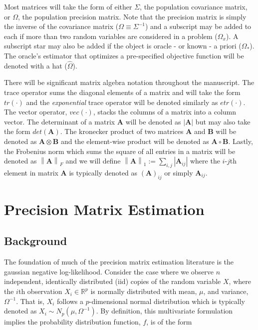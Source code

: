 \documentclass[11pt,]{report}
\theoremstyle{definition}
\theoremstyle{definition}
\theoremstyle{definition}
\theoremstyle{remark}
\begin{document}
Most matrices will take the form of either \(\Sigma\), the population covariance matrix, or \(\Omega\), the population precision matrix. Note that the precision matrix is simply the inverse of the covariance matrix (\(\Omega \equiv \Sigma^{-1}\)) and a subscript may be added to each if more than two random variables are considered in a problem (\(\Omega_{x}\)). A subscript star may also be added if the object is oracle - or known - a priori (\(\Omega_{*}\)). The oracle's estimator that optimizes a pre-specified objective function will be denoted with a hat (\(\hat{\Omega}\)).

There will be significant matrix algebra notation throughout the manuscript. The trace operator sums the diagonal elements of a matrix and will take the form \(tr\left(\cdot\right)\) and the \emph{exponential} trace operator will be denoted similarly as \(etr\left(\cdot\right)\). The vector operator, \(vec\left(\cdot\right)\), stacks the columns of a matrix into a column vector. The determinant of a matrix \(\mathbf{A}\) will be denoted as \(\left|\mathbf{A}\right|\) but may also take the form \(det\left(\mathbf{A}\right)\). The kronecker product of two matrices \(\mathbf{A}\) and \(\mathbf{B}\) will be denoted as \(\mathbf{A} \otimes \mathbf{B}\) and the element-wise product will be denoted as \(\mathbf{A} \circ \mathbf{B}\). Lastly, the Frobenius norm which sums the square of all entries in a matrix will be denoted as \(\left\|\mathbf{A}\right\|_{F}\) and we will define \(\left\|\mathbf{A}\right\|_{1} := \sum_{i, j}\left|\mathbf{A}_{ij}\right|\) where the \(i\)-\(j\)th element in matrix \(\mathbf{A}\) is typically denoted as \(\left(\mathbf{A}\right)_{ij}\) or simply \(\mathbf{A}_{ij}\).

\hypertarget{precision-matrix-estimation}{%
\chapter{Precision Matrix Estimation}\label{precision-matrix-estimation}}

\hypertarget{background}{%
\section{Background}\label{background}}

The foundation of much of the precision matrix estimation literature is the gaussian negative log-likelihood. Consider the case where we observe \(n\) independent, identically distributed (iid) copies of the random variable \(X\), where the \(i\)th observation \(X_{i} \in \mathbb{R}^{p}\) is normally distributed with mean, \(\mu\), and variance, \(\Omega^{-1}\). That is, \(X_{i}\) follows a \(p\)-dimensional normal distribution which is typically denoted as \(X_{i} \sim N_{p}\left( \mu, \Omega^{-1} \right)\). By definition, this multivariate formulation implies the probability distribution function, \(f\), is of the form
\end{document}
